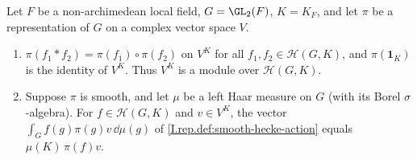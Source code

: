 Let $F$ be a non-archimedean local field, $G=\GL_2(F)$, $K=K_F$, and let $\pi$ be a representation of $G$ on a complex
vector space $V$.
\begin{enumerate}[label=(\alph*)]
\item $\pi(f_1*f_2)=\pi(f_1)\circ\pi(f_2)$ on $V^K$ for all $f_1,f_2\in\mathcal H(G,K)$, and $\pi(\mathbf 1_K)$ is the
  identity of $V^K$. Thus $V^K$ is a module over $\mathcal H(G,K)$.
\item Suppose $\pi$ is smooth, and let $\mu$ be a left Haar measure on $G$ (with its Borel $\sigma$-algebra). For
  $f\in\mathcal H(G,K)$ and $v\in V^K$, the vector $\int_Gf(g)\pi(g)v\,\dd\mu(g)$ of \cref{I.rep.def:smooth-hecke-action}
  equals $\mu(K)\,\pi(f)v$.
\end{enumerate}
